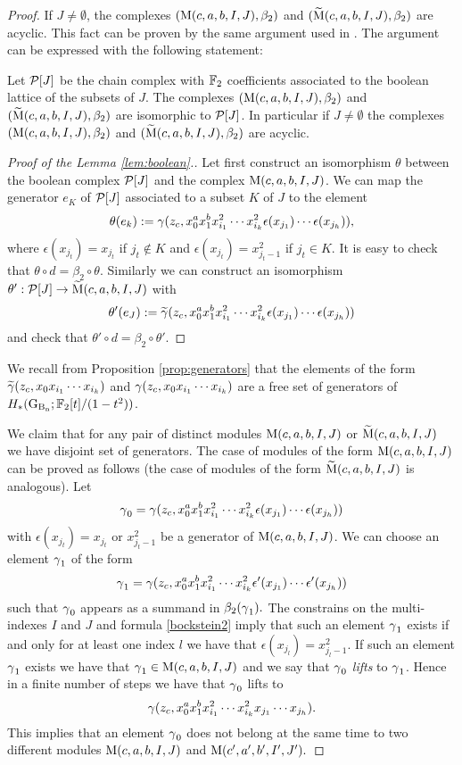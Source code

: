 \begin{proof}
If $J \neq \emptyset$, the complexes $(\operatorname{\mathrm{M}}(c,a,b,I,J), \beta_2)$ and $(\widetilde{\mathrm{M}}(c,a,b,I,J), \beta_2)$ are acyclic. This fact can be proven by the same argument used in \cite[Lem.~4.4]{cal06}.
The argument can be expressed with the following statement:
\begin{lem} \label{lem:boolean}
Let $\mathcal{P}[J]$ be the chain complex with $\mathbb{F}_2$ coefficients associated to the boolean lattice of the subsets of $J$. The complexes $(\operatorname{\mathrm{M}}(c,a,b,I,J), \beta_2)$ and $(\widetilde{\mathrm{M}}(c,a,b,I,J), \beta_2)$ are isomorphic to $\mathcal{P}[J]$. In particular if $J \neq \emptyset$ the complexes $(\operatorname{\mathrm{M}}(c,a,b,I,J), \beta_2)$ and $(\widetilde{\mathrm{M}}(c,a,b,I,J), \beta_2)$ are acyclic.
\end{lem}
\begin{proof}[Proof of the Lemma \ref{lem:boolean}.]
Let first construct an isomorphism $\theta$ between the boolean complex $\mathcal{P}[J]$ and the complex $\operatorname{\mathrm{M}}(c,a,b,I,J)$. We can map the generator $e_K$ of $\mathcal{P}[J]$ associated to a subset $K$ of $J$ to the element $$ \theta(e_k):= \operatorname{\gamma} (z_c, x_0^a x_1^b x_{i_1}^2 \cdots x_{i_k}^2\epsilon(x_{j_1})\cdots \epsilon(x_{j_h})),$$ where $\epsilon(x_{j_t}) = x_{j_t}$ if $j_t \notin K$ and $\epsilon(x_{j_t}) =  x_{j_t-1}^2 $ if $j_t \in K$. It is easy to check that $\theta \circ d = \beta_2 \circ \theta$. Similarly we can construct an isomorphism $\theta': \mathcal{P}[J] \to \widetilde{\mathrm{M}}(c,a,b,I,J)$ with
$$
\theta'(e_J):= \widetilde{\gamma} (z_c, x_0^a x_1^b x_{i_1}^2 \cdots x_{i_k}^2\epsilon(x_{j_1})\cdots \epsilon(x_{j_h}))
$$
and check that $\theta' \circ d = \beta_2 \circ \theta'$.
\end{proof}


We recall from Proposition \ref{prop:generators} that the elements of the form $\widetilde{\gamma} (z_c, x_0 x_{i_1} \cdots x_{i_k})$ and $\operatorname{\gamma} (z_c, x_0 x_{i_1} \cdots x_{i_k})$ are a free set of generators of $H_*(\operatorname{G_{B_{n}}}; \mathbb{F}_2[t]/(1-t^2))$. 



We claim that for any pair of distinct modules $\operatorname{\mathrm{M}}(c,a,b,I,J)$ or $\widetilde{\mathrm{M}}(c,a,b,I,J)$ we have disjoint set of generators.
The case of modules of the form $\operatorname{\mathrm{M}}(c,a,b,I,J)$ can be proved as follows (the case of modules of the form $\widetilde{\mathrm{M}}(c,a,b,I,J)$ is analogous).  
Let
$$
\operatorname{\gamma}_0 = \operatorname{\gamma} (z_c, x_0^a x_1^b x_{i_1}^2 \cdots x_{i_k}^2\epsilon(x_{j_1})\cdots \epsilon(x_{j_h}))
$$
with $\epsilon(x_{j_t}) = x_{j_t} \mbox{ or }  x_{j_t-1}^2$ be a generator of $\operatorname{\mathrm{M}}(c,a,b,I,J)$. We can choose an element $\operatorname{\gamma}_1$ of the form 
$$
\operatorname{\gamma}_1 = \operatorname{\gamma} (z_c, x_0^a x_1^b x_{i_1}^2 \cdots x_{i_k}^2\epsilon'(x_{j_1})\cdots \epsilon'(x_{j_h}))
$$
such that $\operatorname{\gamma}_0$ appears as a summand in $\beta_2(\operatorname{\gamma}_1).$ The constrains on the multi-indexes $I$ and $J$ and formula \eqref{bockstein2} imply that such an element $\operatorname{\gamma}_1$ exists if and only for at least one index $l$ we have that $\epsilon(x_{j_l}) = x_{j_l-1}^2$. If such an element $\operatorname{\gamma}_1$ exists we have that $\operatorname{\gamma}_1 \in \operatorname{\mathrm{M}}(c,a,b,I,J)$ and we say that $\operatorname{\gamma}_0$ \emph{lifts} to $\operatorname{\gamma}_1$. Hence in a finite number of steps we have that $\operatorname{\gamma}_0$ lifts to $$\operatorname{\gamma} (z_c, x_0^a x_1^b x_{i_1}^2 \cdots x_{i_k}^2x_{j_1}\cdots x_{j_h}).
$$  This implies that an element $\operatorname{\gamma}_0$ does not belong at the same time to two different modules
$\operatorname{\mathrm{M}}(c,a,b,I,J)$ and $\operatorname{\mathrm{M}}(c',a',b',I',J').$ 


\end{proof}

